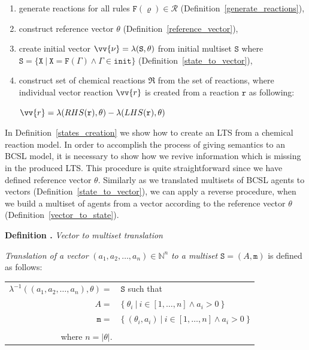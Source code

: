 \documentclass[12pt, twoside]{fithesis2} %
\newcounter{counter}[section]
\renewcommand{\thecounter}{\thesection.\arabic{counter}}
\newenvironment{definition}[1]{\bigskip\refstepcounter{counter}\noindent\textbf{Definition \thecounter } \emph{#1} \par\nopagebreak \begin{itshape}}{\end{itshape}\bigskip}
\begin{document}
\begin{enumerate}
\item generate reactions for all rules $\mathtt{F}(\varrho) \in \mathcal{R}$ (Definition~\ref{generate_reactions}),
\item construct reference vector $\theta$ (Definition~\ref{reference_vector}),
\item create initial vector $\vv{\nu} = \lambda(\mathtt{S}, \theta)$ from initial multiset $\mathtt{S}$ where $\mathtt{S} = \{ \mathtt{X} ~|~ \mathtt{X} = \mathtt{F}(\Gamma) \wedge \Gamma \in \mathtt{init} \}$ (Definition~\ref{state_to_vector}),
\item construct set of chemical reactions $\mathfrak{R}$ from the set of reactions, where individual vector reaction $\vv{r}$ is created from a reaction $\mathtt{r}$ as following:

\begin{center}
$\vv{r} = \lambda(RHS(\mathtt{r}), \theta) - \lambda(LHS(\mathtt{r}), \theta)$
\end{center}

\end{enumerate}

In Definition~\ref{states_creation} we show how to create an LTS from a chemical reaction model. In order to accomplish the process of giving semantics to an BCSL model, it is necessary to show how we revive information which is missing in the produced LTS. This procedure is quite straightforward since we have defined reference vector $\theta$. Similarly as we translated multisets of BCSL agents to vectors (Definition~\ref{state_to_vector}), we can apply a reverse procedure, when we build a multiset of agents from a vector according to the reference vector $\theta$ (Definition~\ref{vector_to_state}).

\begin{definition}{Vector to multiset translation}
\label{vector_to_state}

\emph{Translation of a vector} $(a_1, a_2, \ldots, a_n) \in \mathbb{N}^n$ \emph{to a multiset} $\mathtt{S} = (A, \mathtt{m})$ is defined as follows:

\begin{center}
\begin{tabular}{r@{\hskip 0.08cm}l}
$\lambda^{-1}((a_1, a_2, \ldots, a_n), \theta) =$ & $ \mathtt{S}$ such that\\
$A = $ & $ \{~ \theta_i ~|~ i \in [1, \ldots, n] \wedge a_i > 0 ~\}$\\

$\mathtt{m} = $& $ \{~ (\theta_i, a_i) ~|~ i \in [1, \ldots, n] \wedge a_i > 0 ~\}$\\
& \\
where $n = |\theta|$. &\\
\end{tabular}
\end{center}
\end{definition}
\end{document}
